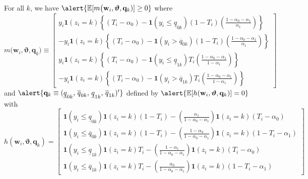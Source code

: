\documentclass[handout]{beamer}
\begin{document}
\begin{frame}
  For all $k$, we have $\alert{\mathbb{E}[m\big(\mathbf{w}_i, \boldsymbol{\vartheta}, \mathbf{q}_k)]\geq 0}$ where
\[
  m\big(\mathbf{w}_i, \boldsymbol{\vartheta}, \mathbf{q}_k) \equiv \left[
  \begin{array}{r}
    y_i \mathbf{1}\left( z_i=k \right)\left\{(T_i - \alpha_0) - \mathbf{1}(y_i \leq \underline{q}_{0k})  (1 - T_i)\left( \frac{1 - \alpha_0 - \alpha_1}{\alpha_1} \right)\right\} \\
    - y_i \mathbf{1}(z_i=k) \left\{ (T_i - \alpha_0) -  \mathbf{1}(y_i > \overline{q}_{0k}) (1 - T_i) \left( \frac{1 - \alpha_0 - \alpha_1}{\alpha_1} \right) \right\} \\
    y_i \mathbf{1}\left( z_i=k \right)\left\{(T_i - \alpha_0) - \mathbf{1}(y_i \leq \underline{q}_{1k})  T_i\left( \frac{1 - \alpha_0 - \alpha_1}{1 - \alpha_1} \right)\right\} \\
    - y_i \mathbf{1}(z_i=k) \left\{ (T_i - \alpha_0) -  \mathbf{1}(y_i > \overline{q}_{1k}) T_i \left( \frac{1 - \alpha_0 - \alpha_1}{1 - \alpha_1} \right) \right\} 
\end{array}
\right] 
\]
and $\alert{\mathbf{q}_k \equiv ( \underline{q}_{0k},\, \overline{q}_{0k},\, \underline{q}_{1k}, \,\overline{q}_{1k})'}$ defined by $\alert{\mathbb{E}[h(\mathbf{w}_i,\boldsymbol{\vartheta},\mathbf{q}_k)]=0}$ with
\[
  h(\mathbf{w}_i,\boldsymbol{\vartheta},\mathbf{q}_k) = \left[
  \begin{array}{l}
    \mathbf{1}(y_i \leq \underline{q}_{0k}) \mathbf{1}(z_i=k)(1 - T_i) 
    - \left( \frac{\alpha_1}{1 - \alpha_0 - \alpha_1} \right) \mathbf{1}(z_i=k)(T_i-\alpha_0)\\ 
    \mathbf{1}(y_i \leq \overline{q}_{0k}) \mathbf{1}(z_i=k)(1 - T_i)
    - \left( \frac{1 - \alpha_0}{1 - \alpha_0 - \alpha_1} \right) \mathbf{1}(z_i=k)(1 - T_i-\alpha_1)\\
    \mathbf{1}(y_i \leq \underline{q}_{1k}) \mathbf{1}(z_i=k)T_i
    - \left( \frac{1 - \alpha_1}{1 - \alpha_0 - \alpha_1} \right) \mathbf{1}(z_i=k)(T_i-\alpha_0)\\ 
    \mathbf{1}(y_i \leq \overline{q}_{1k}) \mathbf{1}(z_i=k)T_i 
    - \left( \frac{\alpha_0}{1 - \alpha_0 - \alpha_1} \right) \mathbf{1}(z_i=k)(1 - T_i-\alpha_1)
  \end{array}
\right]
\]

    \hyperlink{INEQ_BODY}{}
\end{frame}
\end{document}
